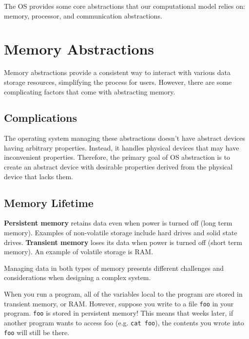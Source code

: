 \documentclass{report}
\begin{document}
The OS provides some core abstractions that our computational model relies on: memory, processor,
and communication abstractions.


\section{Memory Abstractions}
Memory abstractions provide a consistent way to interact with various data storage resources,
simplifying the process for users. However, there are some complicating factors that come with
abstracting memory.


\subsection{Complications}
The operating system managing these abstractions doesn't have abstract devices having arbitrary
properties. Instead, it handles physical devices that may have inconvenient properties. Therefore,
the primary goal of OS abstraction is to create an abstract device with desirable properties derived
from the physical device that lacks them. 

\subsection*{Memory Lifetime}
\begin{tcolorbox}[title=Definition: Persistent and Transient Memory]
  \textbf{Persistent memory} retains data even when power is turned off (long term memory). Examples
  of non-volatile storage include hard drives and solid state drives.
  \tcblower
  \textbf{Transient memory} loses its data when power is turned off (short term memory). An example of
  volatile storage is RAM.
\end{tcolorbox}

Managing data in both types of memory presents different challenges and considerations when
designing a complex system.

\begin{tcolorbox}[colback=blue!5!white,colframe=black!75!blue,title=Example: File Finding] 
  When you run a program, all of the variables local to the program are stored in transient memory,
  or RAM. However, suppose you write to a file \texttt{foo} in your program. \texttt{foo} is stored
  in persistent memory! This means that weeks later, if another program wants to access foo
  (e.g. \texttt{cat foo}), the contents you wrote into \texttt{foo} will still be there.
\end{tcolorbox}
\end{document}
